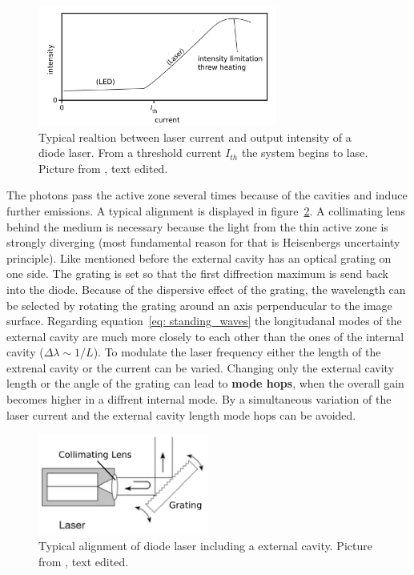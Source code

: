 \begin{figure}
  \centering
  \includegraphics[width = 0.7\textwidth]{pics/threshold.png}
  \caption{Typical realtion between laser current and output intensity of a diode laser. From a threshold current 
  $I_{th}$ the system begins to lase. Picture from \cite{eichler}, text edited.}
  \label{fig: threshold}
\end{figure}

The photons pass the active zone several times because of the cavities and induce further emissions. A typical alignment is displayed in figure~\ref{fig: cavity}.
A collimating lens behind the medium is necessary because the light from the thin active zone is strongly diverging (most 
fundamental reason for that is Heisenbergs uncertainty principle).
Like mentioned before the external cavity has an optical grating on one side. The grating is set so that the first diffrection maximum is send back into the
diode. Because of the dispersive effect of the grating, the wavelength can be selected by rotating the grating around an axis perpenducular
to the image surface. Regarding equation~\eqref{eq: standing_waves} the longitudanal modes of the external cavity are much
more closely to each other than the ones of the internal cavity ($\Delta \lambda \sim 1 / L$).
To modulate the laser frequency either the length of the extrenal cavity or the current can be varied.
Changing only the external cavity length or the angle of the grating can lead to \textbf{mode hops}, when the overall gain becomes higher
in a diffrent internal mode. By a simultaneous variation of the laser current and the external cavity length mode hops can be avoided.

\begin{figure}
  \centering
  \includegraphics[width = 0.5\textwidth]{pics/cavity.pdf}
  \caption{Typical alignment of diode laser including a external cavity. 
  Picture from \cite{eichler}, text edited.}
  \label{fig: cavity}
\end{figure}
